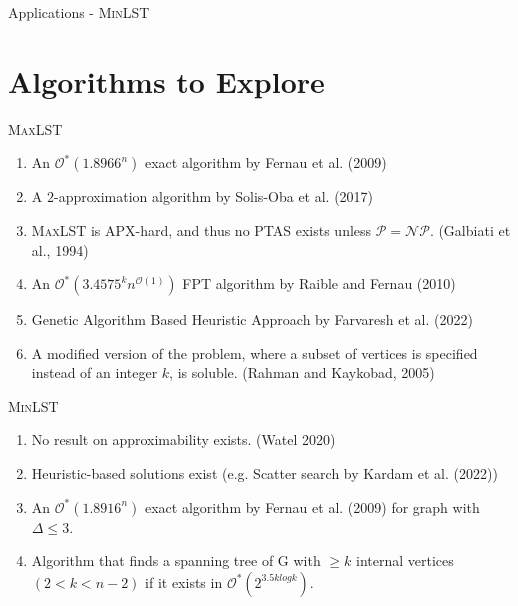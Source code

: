\documentclass{beamer}
\begin{document}
\begin{frame}{Applications - \textsc{MinLST}}


\end{frame}

\section{Algorithms to Explore}

\begin{frame}{\textsc{MaxLST}}
    \begin{enumerate}
        \item An $\mathcal{O}^*(1.8966^n)$ exact algorithm by  Fernau et al. (2009)
        \item A $2$-approximation algorithm by Solis-Oba et al. (2017) 
        \item \textsc{MaxLST} is APX-hard, and thus no PTAS exists unless $\mathcal{P}=\mathcal{NP}$. (Galbiati et al., 1994)
        \item An $\mathcal{O}^*(3.4575^kn^{\mathcal{O}(1)})$ FPT algorithm by Raible and Fernau (2010)
        \item Genetic Algorithm Based Heuristic Approach by Farvaresh et al. (2022)
        \item A modified version of the problem, where a subset of vertices is specified instead of an integer $k$, is soluble. (Rahman and Kaykobad, 2005)
    \end{enumerate}
\end{frame}
\begin{frame}{\textsc{MinLST}}
    \begin{enumerate}
        \item No result on approximability exists. (Watel 2020) 
        \item Heuristic-based solutions exist (e.g. Scatter search by Kardam et al. (2022))
        \item An $\mathcal{O}^*(1.8916^n)$ exact algorithm by  Fernau et al. (2009) for graph with $\Delta \leq 3$.  
        \item Algorithm that finds a spanning tree of G with $\geq k$ internal vertices  $(2 < k < n-2)$ if it exists in $\mathcal{O}^*(2^{3.5klogk})$.
    \end{enumerate}
\end{frame}
\end{document}
